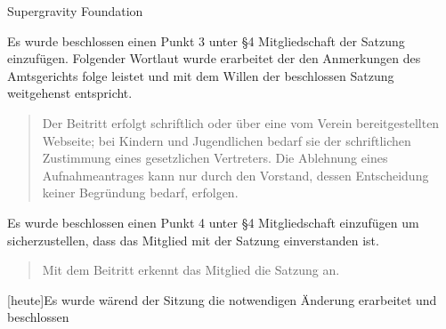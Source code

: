 \documentclass{article}
\begin{document}
\begin{Minutes}{Supergravity Foundation}
 \subtitle{Vorstandstreffen 2016.}

\maketitle
\tableofcontents

Es wurde beschlossen einen Punkt 3 unter §4 Mitgliedschaft der Satzung einzufügen.
Folgender Wortlaut wurde erarbeitet der den Anmerkungen des Amtsgerichts folge leistet und mit dem Willen der beschlossen Satzung weitgehenst entspricht.
\begin{quote}
Der Beitritt erfolgt schriftlich oder über eine vom Verein bereitgestellten Webseite; bei Kindern und Jugendlichen bedarf sie der schriftlichen Zustimmung eines gesetzlichen Vertreters. Die Ablehnung eines Aufnahmeantrages kann nur durch den Vorstand, dessen Entscheidung keiner Begründung bedarf, erfolgen.
\end{quote}
Es wurde beschlossen einen Punkt 4 unter §4 Mitgliedschaft einzufügen um sicherzustellen, dass das Mitglied mit der Satzung einverstanden ist.

\begin{quote}
Mit dem Beitritt erkennt das Mitglied die Satzung an.
\end{quote}

[heute]{Es wurde wärend der Sitzung die notwendigen Änderung erarbeitet und beschlossen}


\signature{Daniel Poelzleithner}

\signature{Iwona Brych}

\end{Minutes}
\end{document}
